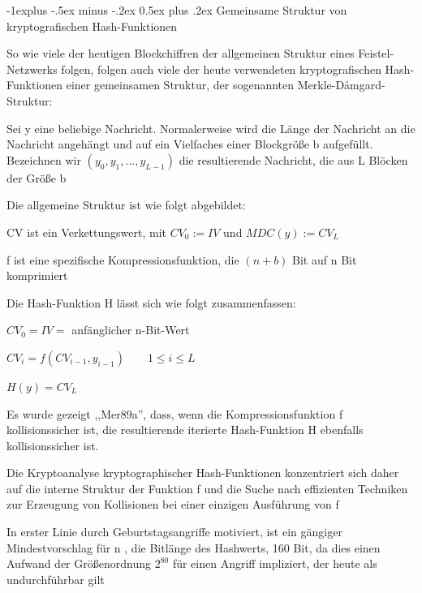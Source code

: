 \documentclass[a4paper]{article}
\makeatletter
\renewcommand{\subsection}{\@startsection{subsection}{2}{0mm}%
 {-1explus -.5ex minus -.2ex}%
 {0.5ex plus .2ex}%
 {\normalfont\normalsize\bfseries}}
\makeatother
\begin{document}
\begin{multicols}{3}
      \subsection{Gemeinsame Struktur von kryptografischen Hash-Funktionen}
      \begin{itemize*}
            \item So wie viele der heutigen Blockchiffren der allgemeinen Struktur eines Feistel-Netzwerks folgen, folgen auch viele der heute verwendeten kryptografischen Hash-Funktionen einer gemeinsamen Struktur, der sogenannten Merkle-Dåmgard-Struktur:
            \begin{itemize*}
                  \item Sei y eine beliebige Nachricht. Normalerweise wird die Länge der Nachricht an die Nachricht angehängt und auf ein Vielfaches einer Blockgröße b aufgefüllt. Bezeichnen wir $(y_0,y_1,...,y_{L-1})$ die resultierende Nachricht, die aus L Blöcken der Größe b
                  \item Die allgemeine Struktur ist wie folgt abgebildet: %
                  \item CV ist ein Verkettungswert, mit $CV_0:= IV$ und $MDC(y) := CV_L$
                  \item f ist eine spezifische Kompressionsfunktion, die $(n+b)$ Bit auf n Bit komprimiert
            \end{itemize*}
            \item Die Hash-Funktion H lässt sich wie folgt zusammenfassen:
            \begin{itemize*}
                  \item $CV_0 = IV =$ anfänglicher n-Bit-Wert
                  \item $CV_i = f(CV_{i -1}, y_{i-1}) \quad\quad 1\leq i \leq L$
                  \item $H(y) = CV_L$
            \end{itemize*}
            \item Es wurde gezeigt ,,Mer89a'', dass, wenn die Kompressionsfunktion f kollisionssicher ist, die resultierende iterierte Hash-Funktion H ebenfalls kollisionssicher ist.
            \item Die Kryptoanalyse kryptographischer Hash-Funktionen konzentriert sich daher auf die interne Struktur der Funktion f und die Suche nach effizienten Techniken zur Erzeugung von Kollisionen bei einer einzigen Ausführung von f
            \item In erster Linie durch Geburtstagsangriffe motiviert, ist ein gängiger Mindestvorschlag für n , die Bitlänge des Hashwerts, 160 Bit, da dies einen Aufwand der Größenordnung $2^{80}$ für einen Angriff impliziert, der heute als undurchführbar gilt
      \end{itemize*}


\end{multicols}
\end{document}
